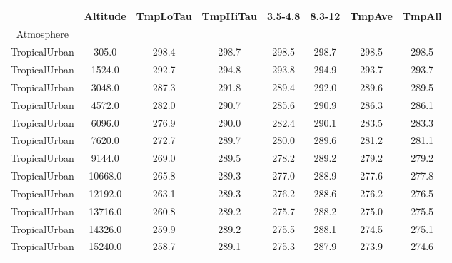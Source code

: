 \documentclass{workpackage}
\begin{document}
\begin{center}

\begin{normalsize}

\begin{tabular}{|c|c|c|c|c|c|c|c|}
\hline
&Altitude&TmpLoTau&TmpHiTau&3.5-4.8&8.3-12&TmpAve&TmpAll\\\hline
Atmosphere&&&&&&&\\\hline
TropicalUrban&305.0&298.4&298.7&298.5&298.7&298.5&298.5\\\hline
TropicalUrban&1524.0&292.7&294.8&293.8&294.9&293.7&293.7\\\hline
TropicalUrban&3048.0&287.3&291.8&289.4&292.0&289.6&289.5\\\hline
TropicalUrban&4572.0&282.0&290.7&285.6&290.9&286.3&286.1\\\hline
TropicalUrban&6096.0&276.9&290.0&282.4&290.1&283.5&283.3\\\hline
TropicalUrban&7620.0&272.7&289.7&280.0&289.6&281.2&281.1\\\hline
TropicalUrban&9144.0&269.0&289.5&278.2&289.2&279.2&279.2\\\hline
TropicalUrban&10668.0&265.8&289.3&277.0&288.9&277.6&277.8\\\hline
TropicalUrban&12192.0&263.1&289.3&276.2&288.6&276.2&276.5\\\hline
TropicalUrban&13716.0&260.8&289.2&275.7&288.2&275.0&275.5\\\hline
TropicalUrban&14326.0&259.9&289.2&275.5&288.1&274.5&275.1\\\hline
TropicalUrban&15240.0&258.7&289.1&275.3&287.9&273.9&274.6\\\hline

\end{tabular}
\end{normalsize}
\end{center}
\end{document}
